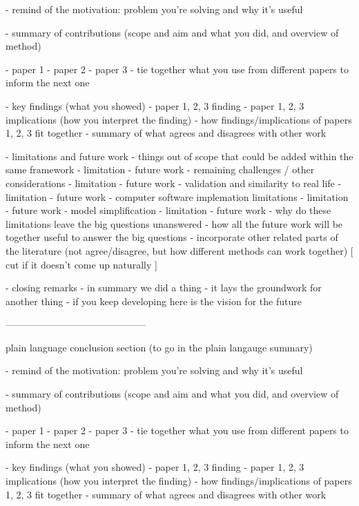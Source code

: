 - remind of the motivation: problem you're solving and why it's useful

- summary of contributions (scope and aim and what you did, and overview of method)

    - paper 1
    - paper 2
    - paper 3
    - tie together what you use from different papers to inform the next one

- key findings (what you showed)
    - paper 1, 2, 3 finding
    - paper 1, 2, 3 implications (how you interpret the finding)
    - how findings/implications of papers 1, 2, 3 fit together
    - summary of what agrees and disagrees with other work

- limitations and future work
    - things out of scope that could be added within the same framework
        - limitation
        - future work
    - remaining challenges / other considerations
        - limitation
        - future work
    - validation and similarity to real life
        - limitation
        - future work
    - computer software implemation limitations
        - limitation
        - future work
    - model simplification
        - limitation
        - future work
    - why do these limitations leave the big questions unanswered
    - how all the future work will be together useful to answer the big questions
    - incorporate other related parts of the literature (not agree/disagree, but how different methods can work together)
        [ cut if it doesn't come up naturally ]

- closing remarks
    - in summary we did a thing
    - it lays the groundwork for another thing
    - if you keep developing here is the vision for the future


    --------------------------------------------

    plain language conclusion section (to go in the plain langauge summary)

    - remind of the motivation: problem you're solving and why it's useful

- summary of contributions (scope and aim and what you did, and overview of method)

    - paper 1
    - paper 2
    - paper 3
    - tie together what you use from different papers to inform the next one

- key findings (what you showed)
    - paper 1, 2, 3 finding
    - paper 1, 2, 3 implications (how you interpret the finding)
    - how findings/implications of papers 1, 2, 3 fit together
    - summary of what agrees and disagrees with other work

